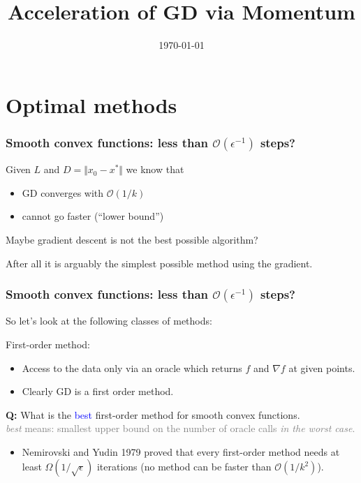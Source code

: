 \documentclass[aspectration=169]{beamer}
\title{Acceleration of GD via Momentum}
\date{\today}
\begin{document}
\maketitle
\frame{\tableofcontents}

\section{Optimal methods}

\begin{frame}
  \frametitle{Smooth convex functions: less than $\mathcal{O}(\epsilon^{-1})$ steps?}
  Given $L$ and $D=\Vert x_0 - x^* \Vert$ we know that
  \begin{itemize}
    \item GD converges with $\mathcal{O}(1/k)$
    \item cannot go faster (``lower bound'')
  \end{itemize}

  Maybe gradient descent is not the best possible algorithm? \medskip

  After all it is arguably the simplest possible method using the gradient.
\end{frame}


\begin{frame}
  \frametitle{Smooth convex functions: less than $\mathcal{O}(\epsilon^{-1})$ steps?}
  So let's look at the following classes of methods:

  First-order method:
  \begin{itemize}
    \item Access to the data only via an oracle which returns $f$ and $\nabla f$ at given points.
    \item Clearly GD is a first order method.
  \end{itemize}

  \textbf{Q:} What is the \textcolor{blue}{best} first-order method for smooth convex functions.\\
  \textcolor{gray}{\textit{best} means: smallest upper bound on the number of oracle calls \textit{in the worst case}.}

  \begin{itemize}
    \item Nemirovski and Yudin 1979 proved that every first-order method needs at least $\Omega(1/\sqrt{\epsilon})$ iterations (no method can be faster than $\mathcal{O}(1/k^2)$).
  \end{itemize}

\end{frame}
\end{document}
